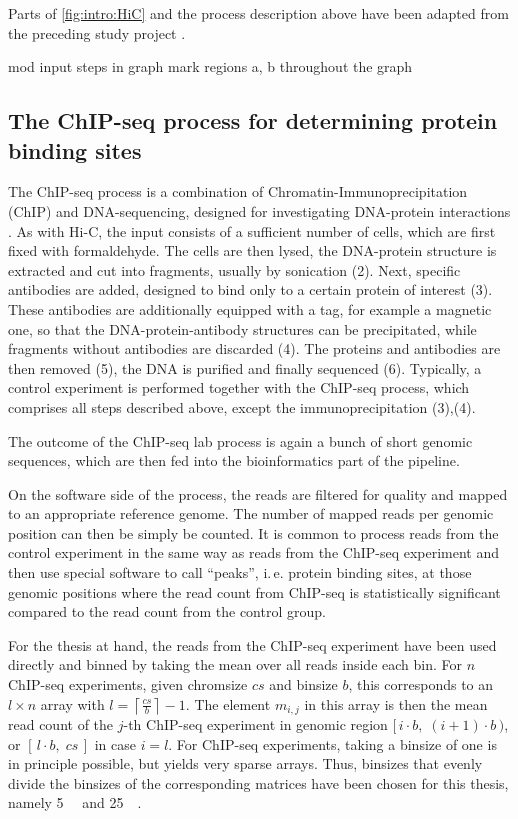 Parts of \cref{fig:intro:HiC} and the process description above 
have been adapted from the preceding study project \cite{Krauth2020}.



\xxx mod input steps in graph
\xxx mark regions a, b throughout the graph

\subsection{The ChIP-seq process for determining protein binding sites}
The ChIP-seq process is a combination of Chromatin-Immunoprecipitation (ChIP) and DNA-sequencing, 
designed for investigating DNA-protein interactions \cite{Johnson2007,Robertson2007}.
As with Hi-C, the input consists of a sufficient number of cells, which are first fixed with formaldehyde.
The cells are then lysed, the DNA-protein structure is extracted and cut into fragments, 
usually by sonication (2).
Next, specific antibodies are added, designed to bind only to a certain protein of interest (3).
These antibodies are additionally equipped with a tag, for example a magnetic one, so that 
the DNA-protein-antibody structures can be precipitated, while fragments without antibodies are discarded (4).
The proteins and antibodies are then removed (5), 
the DNA is purified and finally sequenced (6).
Typically, a control experiment is performed together with the ChIP-seq process, 
which comprises all steps described above, except the immunoprecipitation (3),(4).

The outcome of the ChIP-seq lab process is again a bunch of short genomic sequences, 
which are then fed into the bioinformatics part of the pipeline.

On the software side of the process, the reads are filtered for quality and mapped to an appropriate reference genome.
The number of mapped reads per genomic position can then be simply be counted.
It is common to process reads from the control experiment in the same way as reads from the ChIP-seq experiment
and then use special software to call ``peaks'', i.\,e. protein binding sites,
at those genomic positions where the read count from ChIP-seq
is statistically significant compared to the read count from the control group.

For the thesis at hand, the reads from the ChIP-seq experiment have been used directly
and binned by taking the mean over all reads inside each bin.
For $n$ ChIP-seq experiments, given chromsize $cs$ and binsize $b$,
this corresponds to an $l\times n$ array with $l=\left \lceil{\frac{cs}{b}}\right \rceil -1$.
The element $m_{i,j}$ in this array is then the mean read count
of the $j$-th ChIP-seq experiment in genomic region $[\,i\cdot b, \; (i+1)\cdot b \,)$, or $[\,l\cdot b,\; cs\,]$ in case $i = l$.
For ChIP-seq experiments, taking a binsize of one is in principle possible, but yields very sparse arrays.
Thus, binsizes that evenly divide the binsizes of the corresponding matrices have been chosen for this thesis, namely \SI{5}{\kilo\bp} and \SI{25}{\kilo\bp}.

